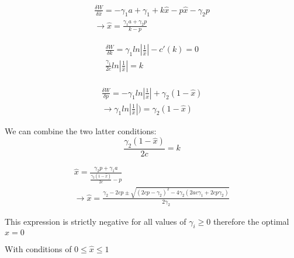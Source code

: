 \documentclass{article}
\begin{document}
\begin{align*}
\frac{\delta W}{\delta \hat{x}}= -\gamma_1 a + \gamma_1 + k \hat{x}-p\hat{x}-\gamma_2 p \\ 
\rightarrow \hat{x} = \frac{\gamma_1 a + \gamma_2p}{k-p} 
\end{align*} 

\begin{align*}
\frac{\delta W}{\delta k}= \gamma_1ln|\frac{1}{\hat{x}}| - c'(k) =0 \\
\frac{\gamma_1}{2c}ln|\frac{1}{\hat{x}}| = k \\
\end{align*} 

\begin{align*}
\frac{\delta W}{\delta p}= - \gamma_1 ln|\frac{1}{\hat{x}}| 
+ \gamma_2(1-\hat{x}) \\
\rightarrow 
\gamma_1 ln|\frac{1}{\hat{x}}| ) = \gamma_2(1-\hat{x}) 
\end{align*}

We can combine the two latter conditions: 
\[
\frac{\gamma_2(1-\hat{x}) }{2c} = k
\]

\begin{align*}
\hat{x} = \frac{\gamma_2 p + \gamma_1 a }{\frac{\gamma_2(1-\hat{x})}{2c} -p} \\
\rightarrow
\hat{x} = \frac{\gamma_2 -2cp \pm \sqrt{(2cp-\gamma_2)^2-4\gamma_2(2ac \gamma_1+2cp\gamma_2)}}{2 \gamma_2}
\end{align*}

This expression is strictly negative for all values of $\gamma_i \geq 0$ therefore the optimal $\hat{x} = 0$


With conditions of $0 \leq \hat{x} \leq 1$
\end{document}
